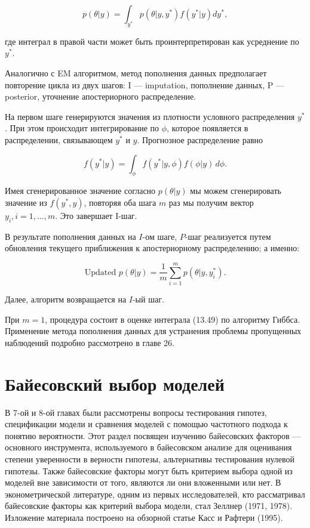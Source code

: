 \begin{equation}
p(\theta|y)=\int_{y^{*}}p(\theta|y,y^{*})f(y^{*}|y)dy^{*},
\end{equation}

где интеграл в правой части может быть проинтерпретирован как усреднение по $y^{*}$. 

Аналогично с EM алгоритмом, метод пополнения данных предполагает повторение цикла из двух шагов: I --- imputation, пополнение данных, P --- posterior, уточнение апостериорного распределение. 


На первом шаге генерируются значения из плотности условного распределения $y^{*}$. При этом происходит интегрирование по $\phi$, которое появляется в распределении,  связывающем $y^{*}$ и $y$. Прогнозное распределение равно 

\begin{equation}
f(y^*|y)=\int_{\phi}f(y^{*}|y,\phi)f(\phi|y)\,d\phi.
\end{equation}

Имея сгенерированное значение согласно $p(\theta|y)$ мы можем сгенерировать значение из $f(y^{*},y)$, повторяя оба шага $m$ раз мы получим  вектор $y_{i}, i=1,\ldots,m$. Это завершает I-шаг.

В результате пополнения данных на $I$-ом шаге, $P$-шаг реализуется путем обновления текущего приближения к апостериорному распределению; а именно:

\begin{equation}
\text{Updated } p(\theta|y)=\frac{1}{m}\sum_{i=1}^{m}p(\theta|y,y_i^*).
\end{equation}

Далее, алгоритм возвращается на $I$-ый шаг.

При $m=1$, процедура состоит в оценке интеграла  (13.49) по алгоритму Гиббса. Применение метода пополнения данных для устранения проблемы пропущенных наблюдений подробно рассмотрено в главе 26.

\section {Байесовский выбор моделей}

В 7-ой и 8-ой главах были рассмотрены  вопросы тестирования гипотез, спецификации модели и сравнения моделей с  помощью частотного подхода к понятию вероятности. Этот раздел посвящен   изучению байесовских факторов ---  основного инструмента, используемого в байесовском анализе для оценивания степени уверенности в верности  гипотезы,  альтернативы тестирования нулевой гипотезы. Также байесовские  факторы могут  быть критерием выбора одной из моделей вне зависимости от того, являются ли они вложенными или нет. В эконометрической литературе, одним из первых исследователей, кто рассматривал байесовские факторы как критерий выбора модели, стал Зеллнер (1971, 1978). Изложение материала  построено на обзорной статье Касс и Рафтери (1995).

